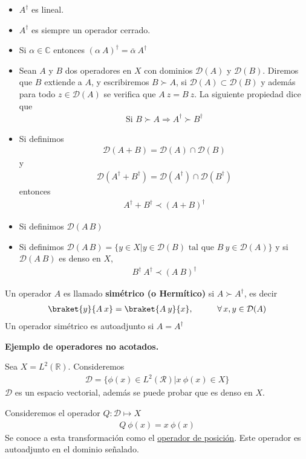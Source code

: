 \begin{itemize}
\item $A^{\dagger}$ es lineal.
\item $A^{\dagger}$ es siempre un operador cerrado.
\item Si $\alpha \in \mathbb{C}$ entonces $(\alpha \: A)^{\dagger} =  \overline{\alpha} \: A^{\dagger}$
\item Sean $A$ y $B$ dos operadores en $X$ con dominios $\mathcal{D}(A)$ y $\mathcal{D}(B)$. Diremos que $B$ extiende a $A$, y escribiremos $B \succ A$, si $\mathcal{D}(A) \subset \mathcal{D}(B)$ y además para todo $z \in \mathcal{D}(A)$ se verifica que $A \: z = B \: z$. La siguiente propiedad dice que
\begin{align*} \mbox{Si } B \succ  A \Rightarrow  A^{\dagger} \succ  B^{\dagger} \end{align*}
\item Si definimos 
\begin{align*} \mathcal{D} (A + B) = \mathcal{D}(A) \cap \mathcal{D}(B)\end{align*}
y
\begin{align*} \mathcal{D} (A^{\dagger} + B^{\dagger}) = \mathcal{D}(A^{\dagger}) \cap \mathcal{D}(B^{\dagger}) \end{align*}
entonces
\begin{align*} A^{\dagger} + B^{\dagger} \prec (A + B)^{\dagger}  \end{align*}
\item Si definimos $\mathcal{D}(A \, B)$
\item Si definimos $\mathcal{D} (A \, B) = \{ y \in X \vert y \in \mathcal{D}(B) \mbox{ tal que } B \: y \in \mathcal{D}(A) \}$ y si $\mathcal{D}(A \: B)$ es denso en $X$,
\begin{align*} B^{\dagger} \: A^{\dagger} \prec (A \: B)^{\dagger} \end{align*}
\end{itemize}
\begin{defi}
Un operador $A$ es llamado \textbf{simétrico (o Hermítico)} si $A \succ A^{\dagger}$, es decir
\begin{align*} \braket{y}{A \: x} = \braket{A \: y}{x}, \hspace{1cm} \forall \, x, y \in \mathcal{D}(A) \end{align*}
Un operador simétrico es autoadjunto si $A = A^{\dagger}$
\end{defi}
\textbf{Ejemplo de operadores no acotados.}
\begin{ejemplo}
Sea $X = L^{2}(\mathbb{R})$. Consideremos
\begin{align*} \mathcal{D} = \{ \phi (x) \in L^{2}(\mathcal{R}) \vert x \: \phi (x) \in X \} \end{align*}
$\mathcal{D}$ es un espacio vectorial, además se puede probar que es denso en $X$.
\par
Consideremos el operador $Q: \mathcal{D} \mapsto X$
\begin{align*} Q \: \phi(x) =  x \: \phi (x) \end{align*}
Se conoce a esta transformación como el \underline{operador de posición}. Este operador es autoadjunto en el dominio señalado.
\end{ejemplo}
